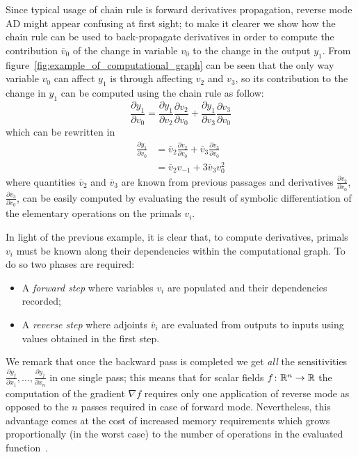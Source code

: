 \clearpage

Since typical usage of chain rule is forward derivatives propagation, reverse mode AD might appear confusing at first sight; to make it clearer we show how the chain rule can be used to back-propagate derivatives in order to compute the contribution $\overline{v}_0$ of the change in variable $v_0$ to the change in the output $y_1$. From figure~\ref{fig:example_of_computational_graph} can be seen that the only way variable $v_0$ can affect $y_1$ is through affecting $v_2$ and $v_3$, so its contribution to the change in $y_1$ can be computed using the chain rule as follow:
\begin{equation}
	\frac{\partial y_1}{\partial v_0} = \frac{\partial y_1}{\partial v_2} \frac{\partial v_2}{\partial v_0} + \frac{\partial y_1}{\partial v_3} \frac{\partial v_3}{\partial v_0}
\end{equation}
which can be rewritten in
\begin{equation}
	\begin{split}
		\frac{\partial y_1}{\partial v_0} & = \overline{v}_2 \frac{\partial v_2}{\partial v_0} + \overline{v}_3 \frac{\partial v_3}{\partial v_0}  \\[2ex]
										  & = \overline{v}_2 v_{-1} + 3 \overline{v}_3 v_0^2
	\end{split}
\end{equation}
where quantities $\overline{v}_2$ and $\overline{v}_3$ are known from previous passages and derivatives $\frac{\partial v_2}{\partial v_0}$, $\frac{\partial v_3}{\partial v_0}$, can be easily computed by evaluating the result of symbolic differentiation of the elementary operations on the primals $v_i$.

\medskip
In light of the previous example, it is clear that, to compute derivatives, primals $v_i$ must be known along their dependencies within the computational graph. To do so two phases are required:
\begin{itemize}
	\item A \emph{forward step} where variables $v_i$ are populated and their dependencies recorded;
	\item A \emph{reverse step} where adjoints $\overline{v}_i$ are evaluated from outputs to inputs using values obtained in the first step.
\end{itemize}
We remark that once the backward pass is completed we get \emph{all} the sensitivities $\frac{\partial y_j}{\partial x_1}, \dots, \frac{\partial y_j}{\partial x_n}$ in one single pass; this means that for scalar fields $f \colon \mathbb{R}^n \to \mathbb{R}$ the computation of the gradient $\nabla f$ requires only one application of reverse mode as opposed to the $n$ passes required in case of forward mode. Nevertheless, this advantage comes at the cost of increased memory requirements which grows proportionally (in the worst case) to the number of operations in the evaluated function~\cite{Baydin:AD_survey}.

